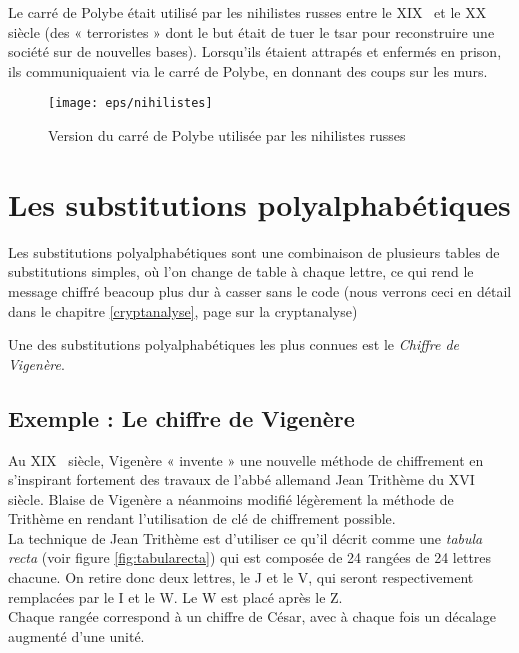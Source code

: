 Le carré de Polybe était utilisé par les nihilistes russes entre le
XIX\ieme~ et le XX\ieme~ siècle (des « terroristes » dont le but était de
tuer le tsar pour reconstruire une société sur de nouvelles
bases). Lorsqu'ils étaient attrapés et enfermés en prison, ils
communiquaient via le carré de Polybe, en donnant des coups sur les
murs. \\ %

\begin{figure}[h]
  \begin{center}
    \texttt{[image: eps/nihilistes]}
  \end{center}
  \caption{Version du carré de Polybe utilisée par les nihilistes
    russes}
  \label{fig:nihilistes}
\end{figure}

\section{Les substitutions polyalphabétiques\label{substitutionpolyalphabetique}}
Les substitutions polyalphabétiques sont une combinaison de plusieurs
tables de substitutions simples, où l'on change de table à chaque
lettre, ce qui rend le message chiffré beacoup plus dur à casser sans
le code (nous verrons ceci en détail dans le chapitre
\ref{cryptanalyse}, page \pageref{cryptanalyse} sur la cryptanalyse)

Une des substitutions polyalphabétiques les plus connues est le
\emph{Chiffre de Vigenère}.

\subsection{Exemple : Le chiffre de Vigenère\label{syst:chiffrevigenere}}
Au XIX\ieme~ siècle, Vigenère « invente » une nouvelle méthode de
chiffrement en s'inspirant fortement des travaux de l'abbé allemand
Jean Trithème du XVI\ieme~ siècle. Blaise de Vigenère a néanmoins
modifié légèrement la méthode de Trithème en rendant l'utilisation de
clé de chiffrement possible.\\

La technique de Jean Trithème est d'utiliser ce qu'il décrit comme une
\emph{tabula recta}
(voir figure \ref{fig:tabularecta}) qui est composée de 24 rangées de 24
lettres chacune. On retire donc deux lettres, le J et le V, qui seront
respectivement remplacées par le I et le W. Le W est placé après le
Z.\\
Chaque rangée correspond à un chiffre de César,
avec à chaque fois un décalage augmenté d'une unité. \\

